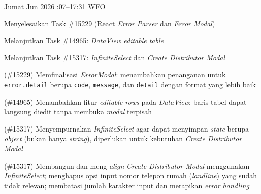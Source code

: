\begin{logtable}
    {
        Jumat  Jun 2026 :07--17:31 \linebreak %
        WFO
    }{
        \begin{loglist}
            \item Menyelesaikan Task \#15229 (React \textit{Error Parser} dan \textit{Error
                Modal})
            \item Melanjutkan Task \#14965: \textit{DataView editable table}
            \item Melanjutkan Task \#15317: \textit{InfiniteSelect} dan \textit{Create
                Distributor Modal}
        \end{loglist}
    }{
        \begin{logwork}
            \item (\#15229) Memfinalisasi \textit{ErrorModal}: menambahkan penanganan untuk \texttt{error.detail} berupa \texttt{code}, \texttt{message}, dan \texttt{detail} dengan format yang lebih baik
            \item (\#14965) Menambahkan fitur \textit{editable rows} pada \textit{DataView}: baris tabel dapat langsung diedit tanpa membuka \textit{modal} terpisah
            \item (\#15317) Menyempurnakan \textit{InfiniteSelect} agar dapat menyimpan \textit{state} berupa \textit{object} (bukan hanya \textit{string}), diperlukan untuk kebutuhan \textit{Create Distributor Modal}
            \item (\#15317) Membangun dan meng-\textit{align} \textit{Create Distributor Modal} menggunakan \textit{InfiniteSelect}; menghapus opsi input nomor telepon rumah (\textit{landline}) yang sudah tidak relevan; membatasi jumlah karakter input dan merapikan \textit{error handling}
        \end{logwork}
    }



\end{logtable}
